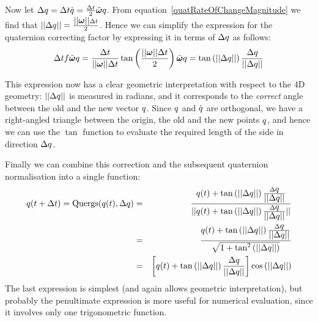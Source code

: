 Now let $\Delta \q{q} = \Delta t \dot{\q{q}} =
    \frac{\Delta t}{2} \tilde{\ve{\omega}} \q{q}$.
From equation~\ref{quatRateOfChangeMagnitude} we find that
$\norm{\Delta\q{q}} = \frac{\norm{\ve{\omega}}\Delta t}{2}$.
Hence we can simplify the expression for the quaternion correcting factor by expressing it
in terms of $\Delta \mbox{$q$}$ as follows:
$$
\Delta t f \tilde{\ve{\omega}}\q{q} = \frac{\Delta t}{\norm{\ve{\omega}}\Delta t}
    \tan\left(\frac{\norm{\ve{\omega}}\Delta t}{2}\right) \tilde{\ve{\omega}} \q{q} =
    \tan\left(\norm{\Delta\q{q}}\right) \frac{\Delta\q{q}}{\norm{\Delta\q{q}}}
$$

This expression now has a clear geometric interpretation with respect to the 4D geometry:
$\mbox{$||\Delta\mbox{$q$}||$}$ is measured in radians, and it corresponds to the \emph{correct}
angle between the old and the new vector $\mbox{$q$}$. Since $\mbox{$q$}$ and
$\dot{\mbox{$q$}}$ are orthogonal, we have a right-angled triangle between the origin,
the old and the new points $\mbox{$q$}$, and hence we can use the $\tan$ function to
evaluate the required length of the side in direction $\Delta\mbox{$q$}$.

Finally we can combine this correction and the subsequent quaternion normalisation into
a single function:
\begin{eqnarray*}
\mbox{$q$}(t+\Delta t) = \mathrm{Quergs}(\mbox{$q$}(t), \Delta\mbox{$q$}) &=&
    \frac{\mbox{$q$}(t) + \tan\left(\mbox{$||\Delta\mbox{$q$}||$}\right)
        \frac{\Delta\mbox{$q$}}{\mbox{$||\Delta\mbox{$q$}||$}}}{
    \mbox{$||\mbox{$q$}(t) + \tan\left(\mbox{$||\Delta\mbox{$q$}||$}\right)
        \frac{\Delta\mbox{$q$}}{\mbox{$||\Delta\mbox{$q$}||$}}||$}} \\
&=& \frac{\mbox{$q$}(t) + \tan\left(\mbox{$||\Delta\mbox{$q$}||$}\right)
        \frac{\Delta\mbox{$q$}}{\mbox{$||\Delta\mbox{$q$}||$}}}{
    \sqrt{1 + \tan^2\left(\mbox{$||\Delta\mbox{$q$}||$}\right)}} \\
&=& \left[\mbox{$q$}(t) + \tan\left(\mbox{$||\Delta\mbox{$q$}||$}\right)
        \frac{\Delta\mbox{$q$}}{\mbox{$||\Delta\mbox{$q$}||$}}\right]
    \cos\left(\mbox{$||\Delta\mbox{$q$}||$}\right)
\end{eqnarray*}
The last expression is simplest (and again allows geometric interpretation), but probably
the penultimate expression is more useful for numerical evaluation, since it involves only
one trigonometric function.
